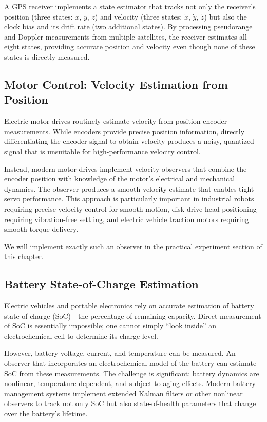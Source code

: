 A GPS receiver implements a state estimator that tracks not only the receiver's position (three states: $x$, $y$, $z$) and velocity (three states: $\dot{x}$, $\dot{y}$, $\dot{z}$) but also the clock bias and its drift rate (two additional states). By processing pseudorange and Doppler measurements from multiple satellites, the receiver estimates all eight states, providing accurate position and velocity even though none of these states is directly measured.

\subsection{Motor Control: Velocity Estimation from Position}

Electric motor drives routinely estimate velocity from position encoder measurements. While encoders provide precise position information, directly differentiating the encoder signal to obtain velocity produces a noisy, quantized signal that is unsuitable for high-performance velocity control.

Instead, modern motor drives implement velocity observers that combine the encoder position with knowledge of the motor's electrical and mechanical dynamics. The observer produces a smooth velocity estimate that enables tight servo performance. This approach is particularly important in industrial robots requiring precise velocity control for smooth motion, disk drive head positioning requiring vibration-free settling, and electric vehicle traction motors requiring smooth torque delivery.

We will implement exactly such an observer in the practical experiment section of this chapter.

\subsection{Battery State-of-Charge Estimation}

Electric vehicles and portable electronics rely on accurate estimation of battery state-of-charge (SoC)---the percentage of remaining capacity. Direct measurement of SoC is essentially impossible; one cannot simply ``look inside'' an electrochemical cell to determine its charge level.

However, battery voltage, current, and temperature can be measured. An observer that incorporates an electrochemical model of the battery can estimate SoC from these measurements. The challenge is significant: battery dynamics are nonlinear, temperature-dependent, and subject to aging effects. Modern battery management systems implement extended Kalman filters or other nonlinear observers to track not only SoC but also state-of-health parameters that change over the battery's lifetime.

